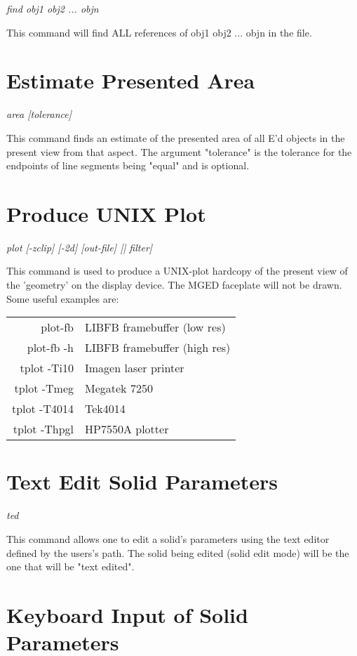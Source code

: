 {\em \center
find obj1 obj2 ... objn
}

This command will find ALL references of obj1 obj2 ... objn in the file.

\section{Estimate Presented Area}

{\em \center
area [tolerance]
}

This command finds an estimate of the presented area of all E'd objects
in the present view from that aspect.
The argument "tolerance" is the tolerance for the endpoints of
line segments being "equal" and is optional.

\section{Produce UNIX Plot}

{\em \center
plot [-zclip] [-2d] [out-file] [| filter]
}

This command is used to produce a UNIX-plot hardcopy of the present view of
the 'geometry' on the display device.
The MGED faceplate will not be drawn.
Some useful examples are:

\begin{tabular}{rl}
plot-fb & LIBFB framebuffer (low res) \\
plot-fb -h & LIBFB framebuffer (high res) \\
tplot -Ti10 & Imagen laser printer \\
tplot -Tmeg & Megatek 7250 \\
tplot -T4014 & Tek4014 \\
tplot -Thpgl & HP7550A plotter
\end{tabular}

\section{Text Edit Solid Parameters}

{\em \center
ted
}

This command allows one to edit a solid's parameters using the text editor
defined by the users's path.
The solid being edited (solid edit mode) will be the one that will be
"text edited".

\section{Keyboard Input of Solid Parameters}

